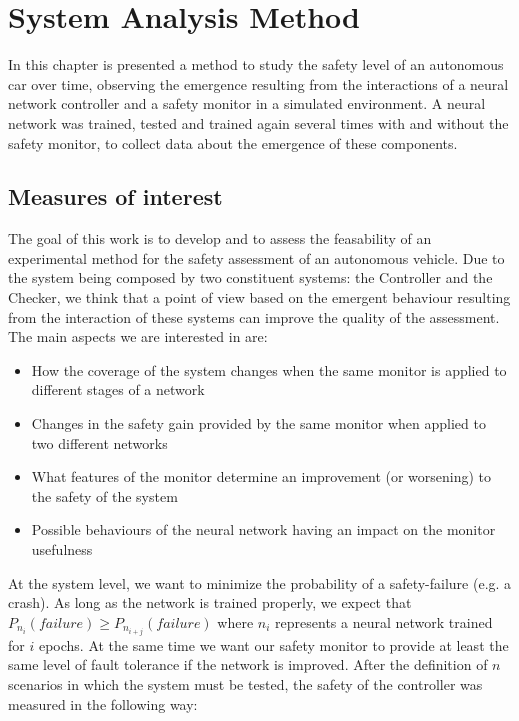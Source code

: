 \chapter{System Analysis Method}

In this chapter is presented a method to study the safety level of an autonomous car over time, observing the emergence resulting from the interactions of a neural network controller and a safety monitor in a simulated environment.\newline
A neural network was trained, tested and trained again several times with and without the safety monitor, to collect data about the emergence of these components.

\section{Measures of interest}

The goal of this work is to develop and to assess the feasability of an experimental method for the safety assessment of an autonomous vehicle. Due to the system being composed by two constituent systems: the Controller and the Checker, we think that a point of view based on the emergent behaviour resulting from the interaction of these systems can improve the quality of the assessment.\newline
The main aspects we are interested in are:

\begin{itemize}
	\item How the coverage of the system changes when the same monitor is applied to different stages of a network
	\item Changes in the safety gain provided by the same monitor when applied to two different networks
	\item What features of the monitor determine an improvement (or worsening) to the safety of the system
	\item Possible behaviours of the neural network having an impact on the monitor usefulness
\end{itemize}

At the system level, we want to minimize the probability of a safety-failure (e.g. a crash). As long as the network is trained properly, we expect that $P_{n_{i}}(failure) \geq P_{n_{i+j}}(failure)$ where $n_{i}$ represents a neural network trained for $i$ epochs. At the same time we want our safety monitor to provide at least the same level of fault tolerance if the network is improved.\newline
After the definition of $n$ scenarios in which the system must be tested, the safety of the controller was measured in the following way:

